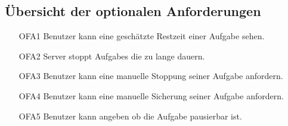 \documentclass[a4paper,12pt]{article}
\begin{document}
\subsection{Übersicht der optionalen Anforderungen}
\begin{itemize}[nosep]
\leftskip=0.5cm
\item[OFA1] \gls{Benutzer} kann eine geschätzte Restzeit einer \gls{Aufgabe} sehen.
\item[OFA2] \gls{Server} stoppt \glspl{Aufgabe} die zu lange dauern.
\item[OFA3] \gls{Benutzer} kann eine manuelle Stoppung seiner \gls{Aufgabe} anfordern.
\item[OFA4] \gls{Benutzer} kann eine manuelle Sicherung seiner \gls{Aufgabe} anfordern.
\item[OFA5] \gls{Benutzer} kann angeben ob die \gls{Aufgabe} pausierbar ist.
\end{itemize}
\newpage
\end{document}
